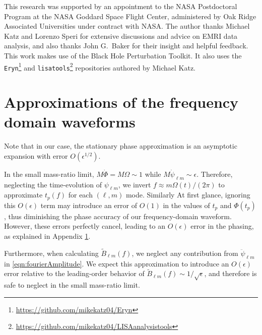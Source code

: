 \documentclass[%
 reprint,
 nofootinbib,
 amsmath,amssymb,
 aps,
 prd,
]{revtex4-2}
\begin{document}
\begin{acknowledgements}
This research was supported by an appointment to the NASA Postdoctoral Program at the NASA Goddard Space Flight Center, administered by Oak Ridge Associated Universities under contract with NASA. The author thanks Michael Katz and Lorenzo Speri for extensive discussions and advice on EMRI data analysis, and also thanks John G.~Baker for their insight and helpful feedback. This work makes use of the Black Hole Perturbation Toolkit. It also uses the \texttt{Eryn}\footnote{\href{https://github.com/mikekatz04/Eryn}{https://github.com/mikekatz04/Eryn}} and \texttt{lisatools}\footnote{\href{https://github.com/mikekatz04/LISAanalysistools}{https://github.com/mikekatz04/LISAanalysistools}} repositories authored by Michael Katz.
\end{acknowledgements}

\appendix

\section{Approximations of the frequency domain waveforms}
\label{app:fourierPhase}

Note that in our case, the stationary phase approximation is an asymptotic expansion with error $O(\epsilon^{1/2})$.

In the small mass-ratio limit, $M\dot{\Phi} = M\Omega \sim 1$ while $M \dot{\psi}_{\ell m} \sim \epsilon$. Therefore, neglecting the time-evolution of ${\psi}_{\ell m}$, we invert $f\approx m\Omega(t)/(2\pi)$ to approximate $t_p(f)$ for each $(\ell, m)$ mode. Similarly  At first glance, ignoring this $O(\epsilon)$ term may introduce an error of $O(1)$ in the values of $t_p$ and $\Phi(t_p)$, thus diminishing the phase accuracy of our frequency-domain waveform. However, these errors perfectly cancel, leading to an $O(\epsilon)$ error in the phasing, as explained in Appendix \ref{app:fourierPhase}.

Furthermore, when calculating $\tilde{B}_{\ell m}(f)$, we neglect any contribution from $\ddot{\psi}_{\ell m}$ in \eqref{eqn:fourierAmplitude}. We expect this approximation to introduce an $O(\epsilon)$ error relative to the leading-order behavior of $\tilde{B}_{\ell m}(f) \sim 1/\sqrt{\epsilon}$, and therefore is safe to neglect in the small mass-ratio limit.
\end{document}
